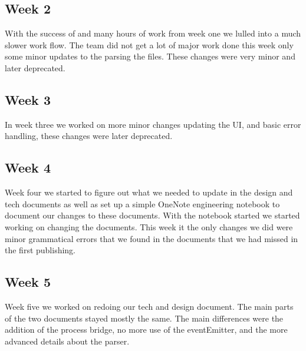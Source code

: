 \documentclass[letterpaper,10pt,titlepage,draftclsnofoot,onecolumn,onesided] {IEEEtran}
\begin{document}
	\subsection{Week 2}
	With the success of and many hours of work from week one we lulled into a much slower work flow. 
	The team did not get a lot of major work done this week only some minor updates to the parsing the files. 
	These changes were very minor and later deprecated.

	\subsection{Week 3}
	In week three we worked on more minor changes updating the UI, and basic error handling, these changes were later deprecated. 

	\subsection{Week 4}
	Week four we started to figure out what we needed to update in the design and tech documents as well as set up a simple OneNote engineering notebook to document our changes to these documents.
	With the notebook started we started working on changing the documents. 
	This week it the only changes we did were minor grammatical errors that we found in the documents that we had missed in the first publishing.

	\subsection{Week 5}
	Week five we worked on redoing our tech and design document.
	The main parts of the two documents stayed mostly the same. 
	The main differences were the addition of the process bridge, no more use of the eventEmitter, and the more advanced details about the parser. 
	
\end{document}
